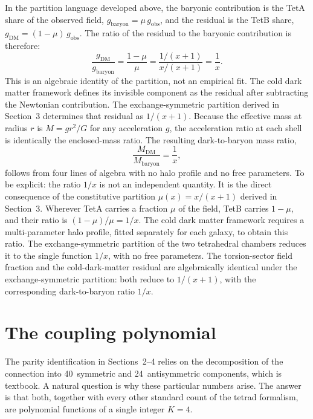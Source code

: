 \documentclass[twocolumn]{iopjournal}
\begin{document}
In the partition language developed above, the baryonic
contribution is the TetA share of the observed field,
$g_{\mathrm{baryon}} = \mu\,g_{\mathrm{obs}}$, and the residual
is the TetB share,
$g_{\mathrm{DM}} = (1 - \mu)\,g_{\mathrm{obs}}$. The ratio of
the residual to the baryonic contribution is therefore:
\begin{equation}
  \frac{g_{\mathrm{DM}}}{g_{\mathrm{baryon}}}
  = \frac{1 - \mu}{\mu}
  = \frac{1/(x+1)}{x/(x+1)}
  = \frac{1}{x}.
  \label{eq:ratio}
\end{equation}
This is an algebraic identity of the partition, not an empirical
fit. The cold dark matter framework defines its invisible
component as the residual after subtracting the Newtonian
contribution. The exchange-symmetric partition derived in
Section~3 determines that residual as $1/(x+1)$. Because the
effective mass at radius $r$ is $M = gr^2/G$ for any
acceleration $g$, the acceleration ratio at each shell is
identically the enclosed-mass ratio. The resulting
dark-to-baryon mass ratio,
\begin{equation}
  \boxed{\frac{M_{\mathrm{DM}}}{M_{\mathrm{baryon}}} = \frac{1}{x},}
  \label{eq:dm_ratio}
\end{equation}
follows from four lines of algebra with no halo profile and no
free parameters. To be explicit: the ratio $1/x$ is not an
independent quantity. It is the direct consequence of the
constitutive partition $\mu(x) = x/(x+1)$ derived in Section~3.
Wherever TetA carries a fraction $\mu$ of the field, TetB
carries $1 - \mu$, and their ratio is $(1 - \mu)/\mu = 1/x$.
The cold dark matter framework requires a multi-parameter halo
profile, fitted separately for each galaxy, to obtain this
ratio. The exchange-symmetric partition of the two tetrahedral
chambers reduces it to the single function $1/x$, with no free
parameters. The torsion-sector field fraction and the
cold-dark-matter residual are algebraically identical under the
exchange-symmetric partition: both reduce to $1/(x{+}1)$, with
the corresponding dark-to-baryon ratio $1/x$.


\section{The coupling polynomial}

The parity identification in Sections~2--4 relies on the
decomposition of the connection into 40~symmetric and
24~antisymmetric components, which is textbook. A natural
question is why these particular numbers arise. The answer is
that both, together with every other standard count of the
tetrad formalism, are polynomial functions of a single integer
$K = 4$.
\end{document}
